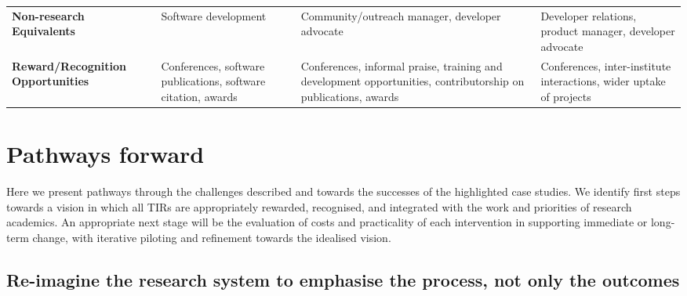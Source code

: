 \documentclass[authordate,meta,issue]{jote-new-article}
\begin{document}
\begin{table*}[t]
\begin{fullwidth}
\begin{tabularx}{\linewidth}{@{} >{\arraybackslash\raggedright}X >{\arraybackslash\raggedright}X >{\arraybackslash\raggedright}X X @{}}
      \textbf{Non-research Equivalents}            & Software development                                                                                                 & Community/outreach manager, developer advocate
                                                   & Developer relations, product manager, developer advocate                                                                                                              \\

      \textbf{Reward/Recognition Opportunities}    & Conferences, software publications, software citation, awards
                                                   & Conferences, informal praise, training and development opportunities, contributorship on publications, awards
                                                   & Conferences, inter-institute interactions, wider uptake of projects                                                                                                   \\
    \end{tabularx}
  \end{fullwidth}
\end{table*}









\section{Pathways forward}



Here we present pathways through the challenges described and towards the successes of the highlighted case studies. We identify first steps towards a vision in which all TIRs are appropriately rewarded, recognised, and integrated with the work and priorities of research academics. An appropriate next stage will be the evaluation of costs and practicality of each intervention in supporting immediate or long-term change, with iterative piloting and refinement towards the idealised vision.







\subsection{Re-imagine the research system to emphasise the process, not only the outcomes}
\end{document}
